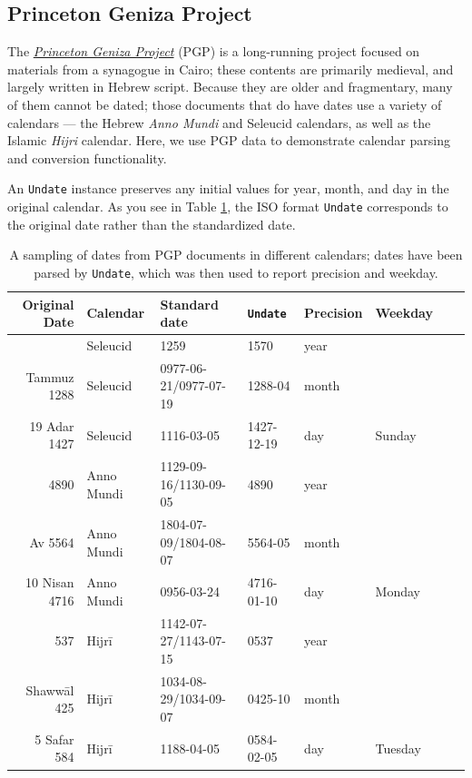 \documentclass{anthology-ch}         %
\begin{document}
\subsection{Princeton Geniza Project}\label{princeton-geniza-project}

The \href{https://geniza.princeton.edu/}{\textit{Princeton Geniza Project}} (PGP) is
a long-running project focused on materials from a synagogue in Cairo; these contents are
primarily medieval, and largely written in Hebrew script. Because they are older and fragmentary, many of them cannot be dated;  those documents that do have dates use a variety of calendars — the Hebrew \textit{Anno Mundi} and Seleucid calendars, as well as the
Islamic \textit{Hijri} calendar.  Here, we use PGP data \cite{rustow_princeton_2025} to demonstrate calendar parsing and conversion functionality. 


An \texttt{Undate} instance preserves any initial values for year, month, and day in the original calendar. As you see in Table \ref{tab:pgp-parsed-dates}, the ISO format \texttt{Undate} corresponds to the original date rather than the standardized date.

\begin{table}[h]
  \centering 
  \begin{tabular}{rlllllll}
    \toprule
Original Date & Calendar & Standard date & \texttt{Undate} & Precision & Weekday \\ 
\midrule\addlinespace[2.5pt]
1570 & Seleucid & 1259 & 1570 & year &  \\
Tammuz 1288 & Seleucid & 0977-06-21/0977-07-19 & 1288-04 & month &  \\
19 Adar 1427 & Seleucid & 1116-03-05 & 1427-12-19 & day & Sunday \\
\midrule
4890 & Anno Mundi & 1129-09-16/1130-09-05 & 4890 & year &  \\
Av 5564 & Anno Mundi & 1804-07-09/1804-08-07 & 5564-05 & month &  \\
10 Nisan 4716 & Anno Mundi & 0956-03-24 & 4716-01-10 & day & Monday \\
\midrule
537 & Hijrī & 1142-07-27/1143-07-15 & 0537 & year &  \\
Shawwāl 425 & Hijrī & 1034-08-29/1034-09-07 & 0425-10 & month &  \\
5 Safar 584 & Hijrī & 1188-04-05 & 0584-02-05 & day & Tuesday \\
\bottomrule
    \bottomrule
  \end{tabular}
  \caption{A sampling of dates from PGP documents in different calendars; dates have been parsed by \texttt{Undate}, which was then used to report precision and weekday.}
  \label{tab:pgp-parsed-dates}
\end{table}
\end{document}
